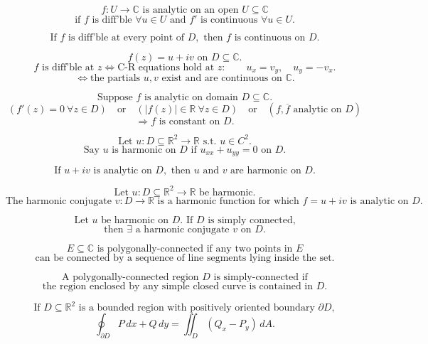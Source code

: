 \documentclass[11pt]{article}
\begin{document}
\[
f:U\to\mathbb C \text{ is analytic on an open }U\subseteq\mathbb C
\]
\[
\text{if } f \text{ is diff'ble } \forall u\in U
\text{ and } f' \text{ is continuous } \forall u\in U.
\]

\[
\text{If } f \text{ is diff'ble at every point of }D,\text{ then }f
\text{ is continuous on }D.
\]

\[
f(z)=u+iv \text{ on }D\subseteq\mathbb C.
\]
\[
f \text{ is diff'ble at } z
\Longleftrightarrow
\text{C-R equations hold at }z:
\qquad u_x=v_y,\quad u_y=-v_x.
\]
\[
\Longleftrightarrow \text{the partials }u,v\text{ exist and are continuous on }\mathbb C.
\]

\[
\text{Suppose }f\text{ is analytic on domain }D\subseteq\mathbb C.
\]
\[
(f'(z)=0\ \forall z\in D)\quad\text{or}\quad(|f(z)|\in\mathbb R\ \forall z\in D)
\quad\text{or}\quad(f,\overline f\text{ analytic on }D)
\]
\[
\Longrightarrow f \text{ is constant on }D.
\]

\newpage


\[
\text{Let }u:D\subseteq\mathbb R^2\to\mathbb R\text{ s.t. }u\in C^2.
\]
\[
\text{Say }u\text{ is harmonic on }D\text{ if }u_{xx}+u_{yy}=0\text{ on }D.
\]

\[
\text{If }u+iv\text{ is analytic on }D,\text{ then }u\text{ and }v
\text{ are harmonic on }D.
\]

\[
\text{Let }u:D\subseteq\mathbb R^2\to\mathbb R\text{ be harmonic.}
\]
\[
\text{The harmonic conjugate }v:D\to\mathbb R
\text{ is a harmonic function for which }f=u+iv
\text{ is analytic on }D.
\]

\[
\text{Let }u\text{ be harmonic on }D.\text{ If }D\text{ is simply connected,}
\]
\[
\text{then }\exists\text{ a harmonic conjugate }v\text{ on }D.
\]

\[
E\subseteq\mathbb C\text{ is polygonally-connected if any two points in }E
\]
\[
\text{can be connected by a sequence of line segments lying inside the set.}
\]

\[
\text{A polygonally-connected region }D\text{ is simply-connected if}
\]
\[
\text{the region enclosed by any simple closed curve is contained in }D.
\]

\[
\text{If }D\subseteq\mathbb R^2\text{ is a bounded region with positively oriented boundary }\partial D,
\]
\[
\oint_{\partial D} P\,dx+Q\,dy
=
\iint_D (Q_x-P_y)\,dA.
\]
\end{document}
